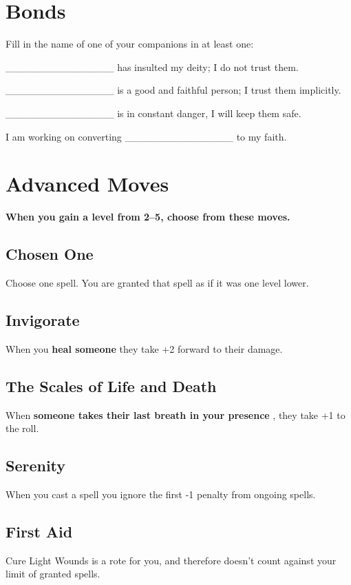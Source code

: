 \section*{Bonds}


 Fill in the name of one of your companions in at least one:


 \_\_\_\_\_\_\_\_\_\_\_\_\_\_\_ has insulted my deity; I do not trust them.


 \_\_\_\_\_\_\_\_\_\_\_\_\_\_\_ is a good and faithful person; I trust them implicitly.


 \_\_\_\_\_\_\_\_\_\_\_\_\_\_\_ is in constant danger, I will keep them safe.


 I am working on converting \_\_\_\_\_\_\_\_\_\_\_\_\_\_\_ to my faith.
\section*{Advanced Moves}


 {\bfseries When you gain a level from 2--5, choose from these moves.}
\subsection{Chosen One}


 Choose one spell. You are granted that spell as if it was one level lower.
\subsection{Invigorate}


 When you \textbf{heal someone}
 they take +2 forward to their damage.
\subsection{The Scales of Life and Death}


 When \textbf{someone takes their last breath in your presence}
, they take +1 to the roll.
\subsection{Serenity}


 When you cast a spell you ignore the first -1 penalty from ongoing spells.
\subsection{First Aid}


 Cure Light Wounds is a rote for you, and therefore doesn't count against your limit of granted spells.
